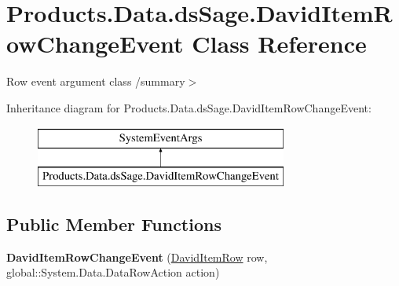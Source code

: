 \hypertarget{class_products_1_1_data_1_1ds_sage_1_1_david_item_row_change_event}{}\section{Products.\+Data.\+ds\+Sage.\+David\+Item\+Row\+Change\+Event Class Reference}
\label{class_products_1_1_data_1_1ds_sage_1_1_david_item_row_change_event}


Row event argument class /summary$>$  


Inheritance diagram for Products.\+Data.\+ds\+Sage.\+David\+Item\+Row\+Change\+Event\+:\begin{figure}[H]
\begin{center}
\leavevmode
\includegraphics[height=2.000000cm]{class_products_1_1_data_1_1ds_sage_1_1_david_item_row_change_event}
\end{center}
\end{figure}
\subsection*{Public Member Functions}
\begin{DoxyCompactItemize}
\item 
{\bfseries David\+Item\+Row\+Change\+Event} (\hyperlink{class_products_1_1_data_1_1ds_sage_1_1_david_item_row}{David\+Item\+Row} row, global\+::\+System.\+Data.\+Data\+Row\+Action action)\hypertarget{class_products_1_1_data_1_1ds_sage_1_1_david_item_row_change_event_a750f291e06dd3e212e99ac8b7679ae26}{}\label{class_products_1_1_data_1_1ds_sage_1_1_david_item_row_change_event_a750f291e06dd3e212e99ac8b7679ae26}

\end{DoxyCompactItemize}
